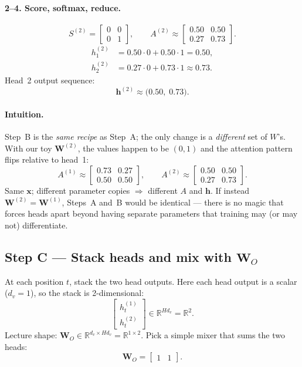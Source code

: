 \documentclass[11pt]{article}
\begin{document}
\paragraph{2--4. Score, softmax, reduce.}
\[
  S^{(2)}
  =
  \begin{bmatrix}
    0 & 0 \\
    0 & 1
  \end{bmatrix},
  \qquad
  A^{(2)}
  \approx
  \begin{bmatrix}
    0.50 & 0.50 \\
    0.27 & 0.73
  \end{bmatrix}.
\]
\[
\begin{aligned}
  h_1^{(2)}
  &= 0.50\cdot 0 + 0.50\cdot 1 = 0.50, \\
  h_2^{(2)}
  &= 0.27\cdot 0 + 0.73\cdot 1 \approx 0.73.
\end{aligned}
\]
Head~2 output sequence:
\[
  \mathbf{h}^{(2)} \approx \bigl(0.50,\; 0.73\bigr).
\]

\paragraph{Intuition.}
Step~B is the \emph{same recipe} as Step~A; the only change is a
\emph{different} set of \(W\)'s. With our toy \(\mathbf{W}^{(2)}\), the
values happen to be \((0,1)\) and the attention pattern flips relative
to head~1:
\[
  A^{(1)}\approx\begin{bmatrix}0.73&0.27\\0.50&0.50\end{bmatrix},
  \qquad
  A^{(2)}\approx\begin{bmatrix}0.50&0.50\\0.27&0.73\end{bmatrix}.
\]
Same \(\mathbf{x}\); different parameter copies \(\Rightarrow\) different
\(A\) and \(\mathbf{h}\). If instead \(\mathbf{W}^{(2)}=\mathbf{W}^{(1)}\),
Steps~A and~B would be identical --- there is no magic that forces heads
apart beyond having separate parameters that training may (or may not)
differentiate.

\subsection{Step C --- Stack heads and mix with \(\mathbf{W}_O\)}

At each position \(t\), stack the two head outputs. Here each head output
is a scalar (\(d_v=1\)), so the stack is 2-dimensional:
\[
  \begin{bmatrix}
    h_t^{(1)} \\[0.25em]
    h_t^{(2)}
  \end{bmatrix}
  \in \mathbb{R}^{H d_v} = \mathbb{R}^{2}.
\]
Lecture shape: \(\mathbf{W}_O \in \mathbb{R}^{d_v \times H d_v}
= \mathbb{R}^{1\times 2}\). Pick a simple mixer that sums the two heads:
\[
  \mathbf{W}_O = \begin{bmatrix}1 & 1\end{bmatrix}.
\]
\end{document}
